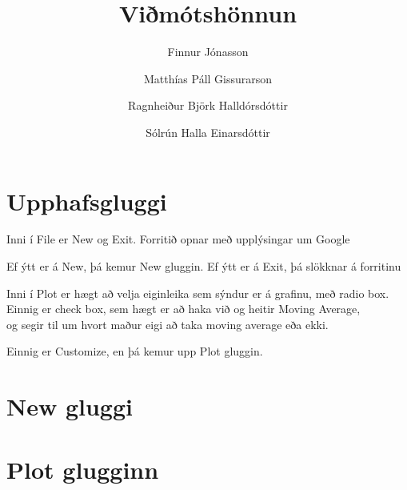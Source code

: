 \documentclass[a4paper,11pt]{article}
\begin{document}
\pagestyle{empty} %

\title{Viðmótshönnun} \author{Finnur Jónasson \and Matthías Páll
  Gissurarson \and Ragnheiður Björk Halldórsdóttir \and Sólrún Halla
  Einarsdóttir}

\section{Upphafsgluggi}

\noindent
Inni í File er New og Exit.  Forritið opnar með upplýsingar um Google

\noindent
Ef ýtt er á New, þá kemur New gluggin.  Ef ýtt er á Exit, þá slökknar
á forritinu

\noindent
Inni í Plot er hægt að velja eiginleika sem sýndur er á grafinu, með
radio box.\\  Einnig er check box, sem hægt er að haka við og heitir
Moving Average,\\ og segir til um hvort maður eigi að taka moving
average eða ekki.

\noindent
Einnig er Customize, en þá kemur upp Plot gluggin.
\vfill
\section{New gluggi}



\section{Plot glugginn}

\end{document}
